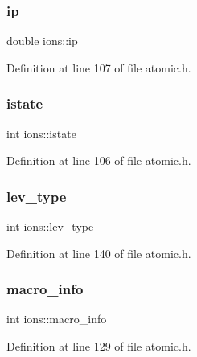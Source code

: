 \mbox{\label{structions_afa8f00012fd4fa84dc26b9c74059aee9}} 
\subsubsection{\texorpdfstring{ip}{ip}}
{\footnotesize\ttfamily double ions\+::ip}



Definition at line 107 of file atomic.\+h.

\mbox{\label{structions_a6c53ccb844643958ab083272b4378be3}} 
\subsubsection{\texorpdfstring{istate}{istate}}
{\footnotesize\ttfamily int ions\+::istate}



Definition at line 106 of file atomic.\+h.

\mbox{\label{structions_a3898cfc092b91dab9a1586d50d6cf79c}} 
\subsubsection{\texorpdfstring{lev\+\_\+type}{lev\_type}}
{\footnotesize\ttfamily int ions\+::lev\+\_\+type}



Definition at line 140 of file atomic.\+h.

\mbox{\label{structions_a298717adc28d36241709fa5d1ecabed3}} 
\subsubsection{\texorpdfstring{macro\+\_\+info}{macro\_info}}
{\footnotesize\ttfamily int ions\+::macro\+\_\+info}



Definition at line 129 of file atomic.\+h.

\mbox{\label{structions_ab0083547f8a577ed8c0edc66564827c8}} 

